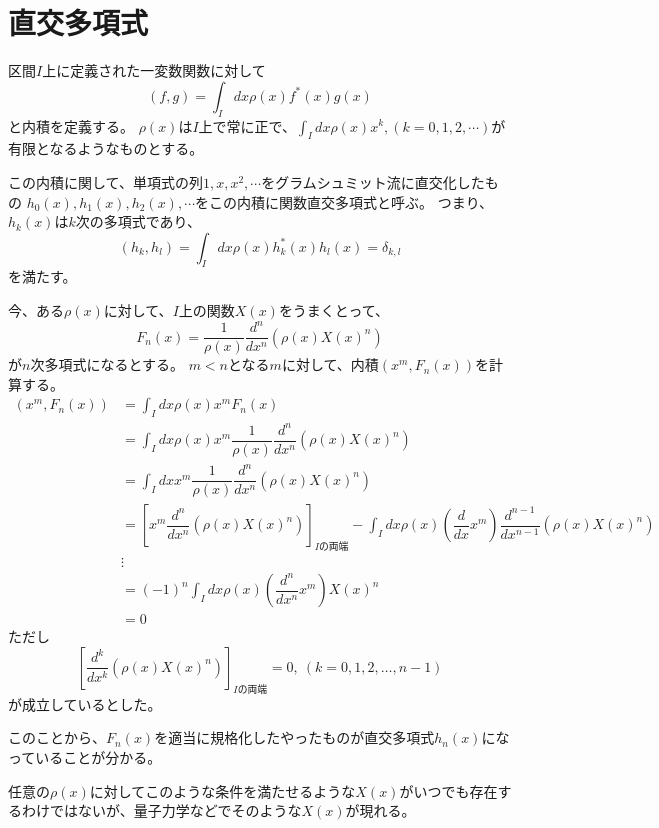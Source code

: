 \section{直交多項式}
区間$I$上に定義された一変数関数に対して
\begin{equation}
	(f,g) = \int_I dx \rho(x)f^*(x)g(x)
\end{equation}
と内積を定義する。
$\rho(x)$は$I$上で常に正で、$\int_I dx\rho(x)x^k,(k = 0,1,2,\cdots)$が有限となるようなものとする。

この内積に関して、単項式の列$1,x,x^2,\cdots$をグラムシュミット流に直交化したもの
$h_0(x), h_1(x), h_2(x), \cdots$をこの内積に関数直交多項式と呼ぶ。
つまり、$h_k(x)$は$k$次の多項式であり、
\begin{equation}
	(h_k,h_l) = \int_I dx\rho(x)h_k^*(x)h_l(x) = \delta_{k,l}
\end{equation}
を満たす。

今、ある$\rho(x)$に対して、$I$上の関数$X(x)$をうまくとって、
\begin{equation}
	\label{Fn}
	F_n(x) = \dfrac{1}{\rho(x)}\dfrac{d^n}{dx^n}(\rho(x)X(x)^n)
\end{equation}
が$n$次多項式になるとする。
$m < n$となる$m$に対して、内積$(x^m, F_n(x))$を計算する。
\begin{align}
	(x^m, F_n(x)) &= \int_I dx\rho(x)x^m F_n(x) \\
	&= \int_I dx\rho(x)x^m \dfrac{1}{\rho(x)}\dfrac{d^n}{dx^n}(\rho(x)X(x)^n) \\
	&= \int_I dx x^m \dfrac{1}{\rho(x)}\dfrac{d^n}{dx^n}(\rho(x)X(x)^n) \\
	&= \left[ x^m \dfrac{d^n}{dx^n}(\rho(x)X(x)^n) \right]_{Iの両端}
	- \int_I dx\rho(x)(\dfrac{d}{dx}x^m)\dfrac{d^{n-1}}{dx^{n-1}}(\rho(x)X(x)^n) \\
	&\vdots  \nonumber\\
	&= (-1)^n\int_I dx\rho(x)(\dfrac{d^n}{dx^n}x^m)X(x)^n \\
	&= 0
\end{align}
ただし
\begin{equation}
	\left[ \dfrac{d^k}{dx^k}(\rho(x)X(x)^n) \right]_{Iの両端} = 0, ~(k = 0,1,2,\ldots,n-1)
\end{equation}
が成立しているとした。

このことから、$F_n(x)$を適当に規格化したやったものが直交多項式$h_n(x)$になっていることが分かる。

任意の$\rho(x)$に対してこのような条件を満たせるような$X(x)$がいつでも存在するわけではないが、量子力学などでそのような$X(x)$が現れる。

